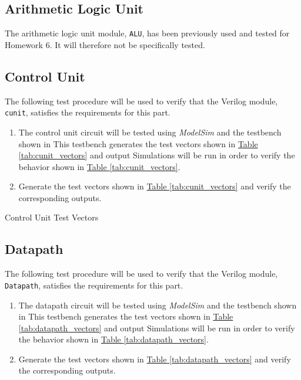 \subsection{Arithmetic Logic Unit} %
\label{sub:arithmetic_logic_unit}

The arithmetic logic unit module, \verb|ALU|, has been previously used and tested for Homework 6.
It will therefore not be specifically tested.

\subsection{Control Unit} %
\label{sub:control_unit_pro}

The following test procedure will be used to verify that the Verilog module, \verb|cunit|, satisfies the requirements for this part.

\begin{enumerate}
    \item The control unit circuit will be tested using \emph{ModelSim} and the testbench shown in %
    This testbench generates the test vectors shown in \hyperref[tab:cunit_vectors]{Table \ref*{tab:cunit_vectors}} and output %
    Simulations will be run in order to verify the behavior shown in \hyperref[tab:cunit_vectors]{Table \ref*{tab:cunit_vectors}}.
    \item Generate the test vectors shown in \hyperref[tab:cunit_vectors]{Table \ref*{tab:cunit_vectors}} and verify the corresponding outputs.
\end{enumerate}

\begin{table}[htbp]
    \centering
    \caption{Control Unit Test Vectors\label{tab:cunit_vectors}}
\end{table}


\subsection{Datapath} %
\label{sub:datapath_pro}

The following test procedure will be used to verify that the Verilog module, \verb|Datapath|, satisfies the requirements for this part.

\begin{enumerate}
    \item The datapath circuit will be tested using \emph{ModelSim} and the testbench shown in %
    This testbench generates the test vectors shown in \hyperref[tab:datapath_vectors]{Table \ref*{tab:datapath_vectors}} and output %
    Simulations will be run in order to verify the behavior shown in \hyperref[tab:datapath_vectors]{Table \ref*{tab:datapath_vectors}}.
    \item Generate the test vectors shown in \hyperref[tab:datapath_vectors]{Table \ref*{tab:datapath_vectors}}
    and verify the corresponding outputs.
\end{enumerate}

